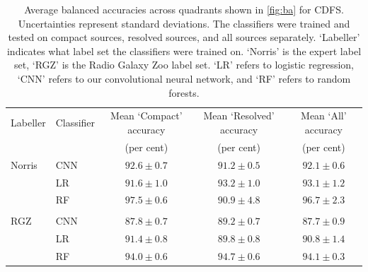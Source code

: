 \documentclass[fleqn,usenatbib,usedcolumn]{mnras}
\begin{document}
    \begin{table}
      \caption{Average balanced accuracies across quadrants shown in
        \autoref{fig:ba} for CDFS. Uncertainties represent standard
        deviations. The classifiers were trained and tested on compact
        sources, resolved sources, and all sources separately. `Labeller'
        indicates what label set the classifiers were trained on. `Norris' is
        the expert label set, `RGZ' is the Radio Galaxy Zoo label set.%
        `LR' refers to logistic regression, `CNN' refers to our convolutional
        neural network, and `RF' refers to random forests.}
      \label{tab:average-accuracies}
      \begin{tabular}{llccc}
        \hline
        Labeller & Classifier & Mean `Compact' accuracy & Mean `Resolved' accuracy & Mean `All' accuracy\\
         & & (per cent) & (per cent) & (per cent)\\
        \hline
        Norris & CNN & $92.6 \pm 0.7$ & $91.2 \pm 0.5$ & $92.1 \pm 0.6$\\
         & LR & $91.6 \pm 1.0$ & $93.2 \pm 1.0$ & $93.1 \pm 1.2$\\
         & RF & $97.5 \pm 0.6$ & $90.9 \pm 4.8$ & $96.7 \pm 2.3$\\
         \\
        RGZ & CNN & $87.8 \pm 0.7$ & $89.2 \pm 0.7$ & $87.7 \pm 0.9$\\
         & LR & $91.4 \pm 0.8$ & $89.8 \pm 0.8$ & $90.8 \pm 1.4$\\
         & RF & $94.0 \pm 0.6$ & $94.7 \pm 0.6$ & $94.1 \pm 0.3$\\
        \hline
      \end{tabular}
    \end{table}
\end{document}
